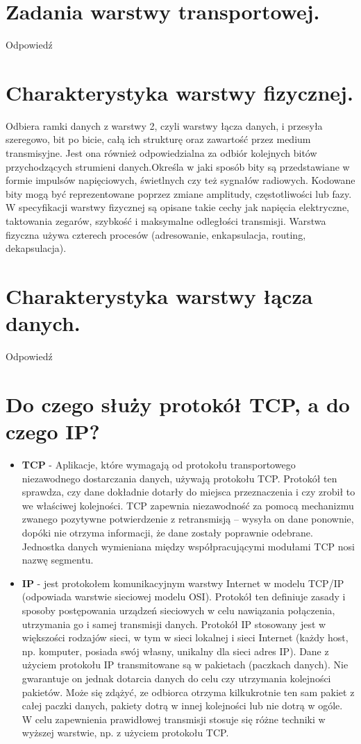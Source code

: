 \documentclass[12pt,a4paper]{article}
\begin{document}
	\section{Zadania warstwy transportowej.}
	Odpowiedź

	\section{Charakterystyka warstwy fizycznej.}
	Odbiera ramki danych z warstwy 2, czyli warstwy łącza danych, i przesyła szeregowo, bit po bicie, całą ich strukturę oraz zawartość przez medium transmisyjne. Jest ona również odpowiedzialna za odbiór kolejnych bitów przychodzących strumieni danych.Określa w jaki sposób bity są przedstawiane w formie impulsów napięciowych, świetlnych czy też sygnałów radiowych. Kodowane bity mogą być reprezentowane poprzez zmiane amplitudy, częstotliwości lub fazy.\\	
	W specyfikacji warstwy fizycznej są opisane takie cechy jak napięcia elektryczne, taktowania zegarów, szybkość i maksymalne odległości transmisji. Warstwa fizyczna używa czterech procesów (adresowanie, enkapsulacja, routing, dekapsulacja).

	\section{Charakterystyka warstwy łącza danych.}
	Odpowiedź

	\section{Do czego służy protokół TCP, a do czego IP?}
	\begin{itemize}
		\item \textbf{TCP} - Aplikacje, które wymagają od protokołu transportowego niezawodnego dostarczania danych, używają protokołu TCP. Protokół ten sprawdza, czy dane dokładnie dotarły do miejsca przeznaczenia i czy zrobił to we właściwej kolejności. TCP zapewnia niezawodność za pomocą mechanizmu zwanego pozytywne potwierdzenie z retransmisją – wysyła on dane ponownie, dopóki nie otrzyma informacji, że dane zostały poprawnie odebrane. Jednostka danych wymieniana między współpracującymi modułami TCP nosi nazwę segmentu.
		\item \textbf{IP} - jest protokołem komunikacyjnym warstwy Internet w modelu TCP/IP (odpowiada warstwie sieciowej modelu OSI). Protokół ten definiuje zasady i sposoby postępowania urządzeń sieciowych w celu nawiązania połączenia, utrzymania go i samej transmisji danych. Protokół IP stosowany jest w większości rodzajów sieci, w tym w sieci lokalnej i sieci Internet (każdy host, np. komputer, posiada swój własny, unikalny dla sieci adres IP). Dane z użyciem protokołu IP transmitowane są w pakietach (paczkach danych). Nie gwarantuje on jednak dotarcia danych do celu czy utrzymania kolejności pakietów. Może się zdążyć, ze odbiorca otrzyma kilkukrotnie ten sam pakiet z całej paczki danych, pakiety dotrą w innej kolejności lub nie dotrą w ogóle. W celu zapewnienia prawidłowej transmisji stosuje się różne techniki w wyższej warstwie, np. z użyciem protokołu TCP.
	\end{itemize}
\end{document}
